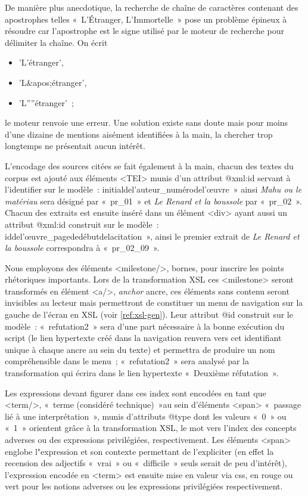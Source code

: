 \documentclass[12pt, a4paper]{article}
\begin{document}
De manière plus anecdotique, la recherche de chaîne de caractères contenant des apostrophes telles «~L'Étranger, L'Immortelle~» pose un problème épineux à résoudre car l'apostrophe est le signe utilisé par le moteur de recherche pour délimiter la chaîne. On écrit 
\begin{itemize}
    \item 'L'étranger', 
    \item 'L\&apos;étranger',
    \item 'L''''étranger'~; 
\end{itemize}
le moteur renvoie une erreur. Une solution existe sans doute mais pour moins d'une dizaine de mentions aisément identifiées à la main, la chercher trop longtemps ne présentait aucun intérêt.


L'encodage des sources citées se fait également à la main, chacun des textes du corpus est ajouté aux éléments <TEI> munis d'un attribut @xml\NoAutoSpaceBeforeFDP:id servant à l'identifier sur le modèle~: initialdel'auteur\_numérodel'œuvre~» ainsi \textit{Mahu ou le matériau} sera désigné par «~pr\_01~» et \textit{Le Renard et la boussole} par «~pr\_02~». Chacun des extraits est ensuite inséré dans un élément <div> ayant aussi un attribut @xml\NoAutoSpaceBeforeFDP:id construit sur le modèle~: iddel'œuvre\_pagededébutdelacitation~», ainsi le premier extrait de \textit{Le Renard et la boussole} correspondra à «~pr\_02\_09~».    

\label{encMilestone} Nous employons des éléments <milestone/>, bornes, pour inscrire les points rhétoriques importants. Lors de la transformation XSL ces <milestone> seront transformés en élément <a/>, \textit{anchor} ancre, ces éléments sans contenu seront invisibles au lecteur mais permettront de constituer un menu de navigation sur la gauche de l'écran en XSL (voir \ref{ref:xsl-gen}). Leur attribut @id construit sur le modèle~: «~refutation2~»
sera d'une part nécessaire à la bonne exécution du script (le lien hypertexte créé dans la navigation renvera vers cet identifiant unique à chaque ancre au sein du texte) et permettra de produire un nom compréhensible dans le menu~; «~refutation2~» sera analysé par la transformation qui écrira dans le lien hypertexte «~Deuxième réfutation~».


\label{encW} Les expressions devant figurer dans ces index sont encodées en tant que <term/>, «~terme (considéré technique)~»au sein d'éléments <span> «~passage lié à une interprétation~», munis d'attributs @type dont les valeurs «~0~» ou «~1~» orientent grâce à la transformation XSL, le mot vers l'index des concepts adverses ou des expressions privilégiées, respectivement. Les éléments <span> englobe l"expression et son contexte permettant de l'expliciter (en effet la recension des adjectifs «~vrai~» ou «~difficile~»  seuls serait de peu d'intérêt), l'expression encodée en <term> est ensuite mise en valeur via css, en rouge ou vert pour les notions adverses ou les expressions privilégiées respectivement.
\end{document}

